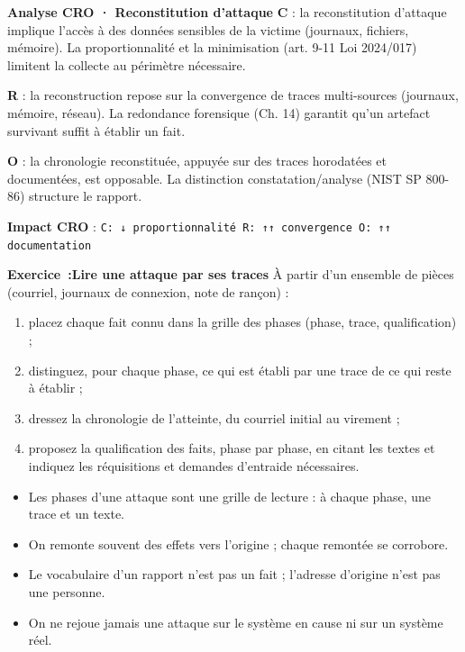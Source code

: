 \begin{boxCRO}
\textbf{Analyse CRO · Reconstitution d'attaque}
\textbf{C} : la reconstitution d'attaque implique l'accès à des données sensibles de la victime (journaux, fichiers, mémoire). La proportionnalité et la minimisation (art. 9-11 Loi 2024/017) limitent la collecte au périmètre nécessaire.

\textbf{R} : la reconstruction repose sur la convergence de traces multi-sources (journaux, mémoire, réseau). La redondance forensique (Ch. 14) garantit qu'un artefact survivant suffit à établir un fait.

\textbf{O} : la chronologie reconstituée, appuyée sur des traces horodatées et documentées, est opposable. La distinction constatation/analyse (NIST SP 800-86) structure le rapport.

\textbf{Impact CRO} : \texttt{C: ↓ proportionnalité \quad R: ↑↑ convergence \quad O: ↑↑ documentation}
\end{boxCRO}

\begin{boxexo}
\textbf{Exercice~:Lire une attaque par ses traces}
À partir d'un ensemble de pièces (courriel, journaux de connexion, note de rançon) :
\begin{enumerate}
\item placez chaque fait connu dans la grille des phases (phase, trace, qualification) ;
\item distinguez, pour chaque phase, ce qui est établi par une trace de ce qui reste à établir ;
\item dressez la chronologie de l'atteinte, du courriel initial au virement ;
\item proposez la qualification des faits, phase par phase, en citant les textes et indiquez les réquisitions et demandes d'entraide nécessaires.
\end{enumerate}
\end{boxexo}

\begin{boxresume}
\begin{itemize}
\item Les phases d'une attaque sont une grille de lecture : à chaque phase, une trace et un texte.
\item On remonte souvent des effets vers l'origine ; chaque remontée se corrobore.
\item Le vocabulaire d'un rapport n'est pas un fait ; l'adresse d'origine n'est pas une personne.
\item On ne rejoue jamais une attaque sur le système en cause ni sur un système réel.
\end{itemize}
\end{boxresume}

